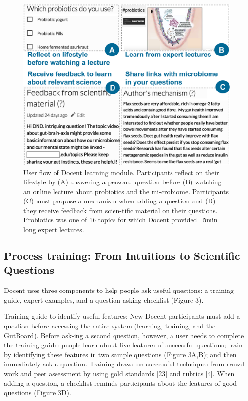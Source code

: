 \begin{figure}[h] 
  \centering
  \includegraphics[width=1.0\textwidth]{figures/docent/fig-2.png}
  \caption[]
{User flow of Docent learning module. Participants reflect on their lifestyle by (A) answering a personal question before (B) watching an online lecture about probiotics and the mi-crobiome. Participants (C) must propose a mechanism when adding a question and (D) they receive feedback from scien-tific material on their questions. Probiotics was one of 16 topics for which Docent provided ~5min long expert lectures.}
  \label{fig:docent-2}
\end{figure}

\subsection{Process training: From Intuitions to Scientific Questions}
Docent uses three components to help people ask useful questions: a training guide, expert examples, and a question-asking checklist (Figure 3). 

Training guide to identify useful features: New Docent participants must add a question before accessing the entire system (learning, training, and the GutBoard). Before ask-ing a second question, however, a user needs to complete the training guide: people learn about five features of successful questions; train by identifying these features in two sample questions (Figure 3A,B); and then immediately ask a question. Training draws on successful techniques from crowd work and peer assessment by using gold standards [23] and rubrics [4]. When adding a question, a checklist reminds participants about the features of good questions (Figure 3D).

